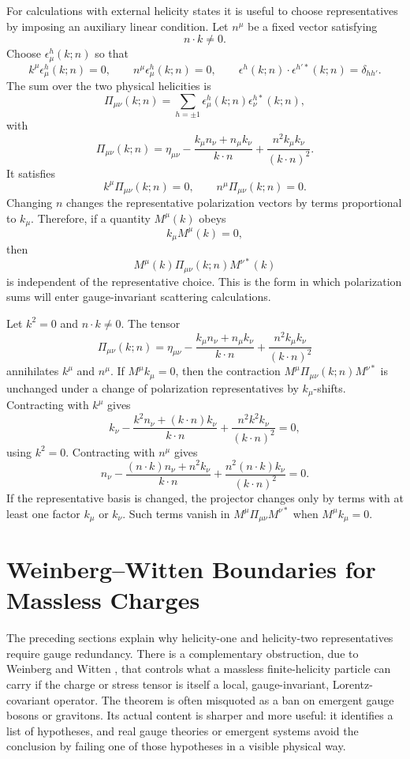 For calculations with external helicity states it is useful to choose
representatives by imposing an auxiliary linear condition. Let \(n^\mu\) be a
fixed vector satisfying
\[
  n\cdot k\ne0 .
\]
Choose \(\epsilon_\mu^h(k;n)\) so that
\[
  k^\mu\epsilon_\mu^h(k;n)=0,
  \qquad
  n^\mu\epsilon_\mu^h(k;n)=0,
  \qquad
  \epsilon^h(k;n)\cdot\epsilon^{h'*}(k;n)=\delta_{hh'} .
\]
The sum over the two physical helicities is
\[
  \Pi_{\mu\nu}(k;n)
  =
  \sum_{h=\pm1}
  \epsilon_\mu^h(k;n)\epsilon_\nu^{h*}(k;n),
\]
with
\[
  \Pi_{\mu\nu}(k;n)
  =
  \eta_{\mu\nu}
  -
  \frac{k_\mu n_\nu+n_\mu k_\nu}{k\cdot n}
  +
  \frac{n^2 k_\mu k_\nu}{(k\cdot n)^2}.
\]
It satisfies
\[
  k^\mu\Pi_{\mu\nu}(k;n)=0,
  \qquad
  n^\mu\Pi_{\mu\nu}(k;n)=0.
\]
Changing \(n\) changes the representative polarization vectors by terms
proportional to \(k_\mu\). Therefore, if a quantity \(M^\mu(k)\) obeys
\[
  k_\mu M^\mu(k)=0,
\]
then
\[
  M^\mu(k)\Pi_{\mu\nu}(k;n)M^{\nu *}(k)
\]
is independent of the representative choice. This is the form in which
polarization sums will enter gauge-invariant scattering calculations.

Let \(k^2=0\) and \(n\cdot k\ne0\).  The tensor
  \[
    \Pi_{\mu\nu}(k;n)
    =
    \eta_{\mu\nu}
    -
    \frac{k_\mu n_\nu+n_\mu k_\nu}{k\cdot n}
    +
    \frac{n^2 k_\mu k_\nu}{(k\cdot n)^2}
  \]
  annihilates \(k^\mu\) and \(n^\mu\).  If \(M^\mu k_\mu=0\), then the
  contraction \(M^\mu\Pi_{\mu\nu}(k;n)M^{\nu *}\) is unchanged under a change
  of polarization representatives by \(k_\mu\)-shifts.
Contracting with \(k^\mu\) gives
\[
  k_\nu-\frac{k^2 n_\nu+(k\cdot n)k_\nu}{k\cdot n}
  +\frac{n^2k^2k_\nu}{(k\cdot n)^2}=0,
\]
using \(k^2=0\).  Contracting with \(n^\mu\) gives
\[
  n_\nu-\frac{(n\cdot k)n_\nu+n^2k_\nu}{k\cdot n}
  +\frac{n^2(n\cdot k)k_\nu}{(k\cdot n)^2}=0.
\]
If the representative basis is changed, the projector changes only by terms
with at least one factor \(k_\mu\) or \(k_\nu\).  Such terms vanish in
\(M^\mu\Pi_{\mu\nu}M^{\nu *}\) when \(M^\mu k_\mu=0\).

\section{Weinberg--Witten Boundaries for Massless Charges}
\label{sec:weinberg-witten-boundaries-massless-charges}

The preceding sections explain why helicity-one and helicity-two
representatives require gauge redundancy.  There is a complementary
obstruction, due to Weinberg and Witten
\cite{WeinbergWitten1980,Loebbert2008WeinbergWitten,
BenedettiCasiniMagan2022Noether}, that controls what a massless
finite-helicity particle can carry if the charge or stress tensor is itself a
local, gauge-invariant, Lorentz-covariant operator.  The theorem is often
misquoted as a ban on emergent gauge bosons or gravitons.  Its actual content
is sharper and more useful: it identifies a list of hypotheses, and real
gauge theories or emergent systems avoid the conclusion by failing one of
those hypotheses in a visible physical way.

